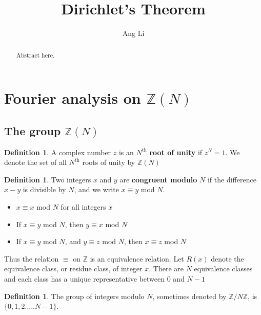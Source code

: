 \documentclass[psamsfonts]{amsart}
\theoremstyle{definition}
\newtheorem{defn}[thm]{Definition}
\theoremstyle{remark}
\numberwithin{equation}{section}
\begin{document}
	\begin{abstract}
		Abstract here.
	\end{abstract}
	
	\title{Dirichlet's Theorem}
	\author{Ang Li}
	\date{}
	\maketitle
	
	\tableofcontents
	
	\section{Fourier analysis on $\mathbb{Z}(N)$ }
		\vspace{5mm}
		\subsection{The group $\mathbb{Z}(N)$}
			\begin{defn}
				A complex number $z$ is an $N^{\text{th}}$ \textbf{root of unity} if $z^N = 1$. We denote the set of all $N^{\text{th}}$ roots of unity by $\mathbb{Z}(N)$
			\end{defn}
		
			\begin{defn}
				Two integers $x$ and $y$ are \textbf{congruent modulo} $N$ if the difference $x-y$ is divisible by $N$, and we write $x \equiv y$ mod $N$.
			\end{defn}
		
			\begin{itemize}
				\item $x \equiv x$ mod $N$ for all integers $x$
				\item If $x \equiv y$ mod $N$, then $y \equiv x$ mod $N$
				\item If $x \equiv y$ mod $N$, and $y \equiv z$ mod $N$, then $x \equiv z$ mod $N$ 
			\end{itemize}	
			\vspace{2mm}
			Thus the relation $\equiv$ on $\mathbb{Z}$ is an equivalence relation. Let $R(x)$ denote the equivalence class, or residue class, of integer $x$. There are $N$ equivalence classes and each class has a unique representative between $0$ and $N-1$
		
			\begin{defn}
				The group of integers modulo $N$, sometimes denoted by $\mathbb{Z}/N\mathbb{Z}$, is $\{0,1,2.....N-1\}$.
			\end{defn}		
		\vspace{1mm}		
		
\end{document}
